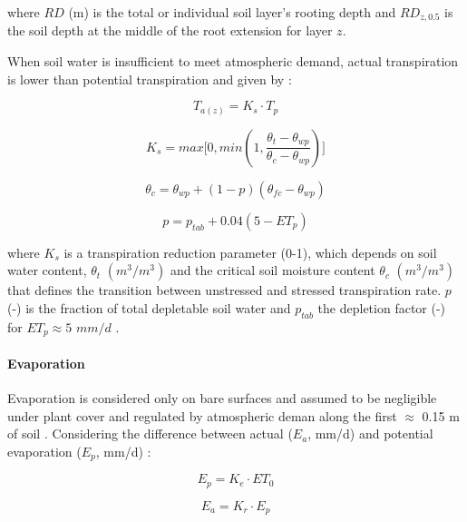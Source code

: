\documentclass[]{article}
\let\oldparagraph\paragraph
\renewcommand{\paragraph}[1]{\oldparagraph{#1}\mbox{}}
\begin{document}
where \(RD\) (m) is the total or individual soil layer's rooting depth
and \(RD_{z, 0.5}\) is the soil depth at the middle of the root
extension for layer \(z\).

When soil water is insufficient to meet atmospheric demand, actual
transpiration is lower than potential transpiration and given by
\citep{Sheikh2009}:

\begin{equation}
T_{a(z)} = K_s \cdot T_p
\label{eq:Taz}  
\end{equation}

\begin{equation}
K_s= max \Big[ 0, min(1, \frac{\theta_t - \theta_{wp} }{ \theta_c - \theta_{wp} }) \Big]
\label{eq:Ks}  
\end{equation}

\begin{equation}
\theta_c = \theta_{wp} + (1 - p)(\theta_{fc}- \theta_{wp}) 
\label{eq:theta_c}  
\end{equation}

\begin{equation}
p = p_{tab} + 0.04(5-ET_p)
\label{eq:p}  
\end{equation}

where \(K_s\) is a transpiration reduction parameter (0-1), which
depends on soil water content, \(\theta_t\) \((m^3/m^3)\) and the
critical soil moisture content \(\theta_c\) \((m^3/m^3)\) that defines
the transition between unstressed and stressed transpiration rate. \(p\)
(-) is the fraction of total depletable soil water and \(p_{tab}\) the
depletion factor (-) for \(ET_p \approx 5\) \(mm/d\) \citep[Table no.
22]{Allen1998}.

\hypertarget{evaporation}{%
\paragraph{Evaporation}\label{evaporation}}

Evaporation is considered only on bare surfaces and assumed to be
negligible under plant cover and regulated by atmospheric deman along
the first \(\approx\) 0.15 m of soil \citep{Sheikh2009}. Considering the
difference between actual (\(E_a\), mm/d) and potential evaporation
(\(E_p\), mm/d) \citep{Allen1998}:

\begin{equation}
E_p=K_e \cdot ET_0
\label{eq:Ep}  
\end{equation}

\begin{equation}
E_a=K_r \cdot E_p
\label{eq:Ea}  
\end{equation}
\end{document}
